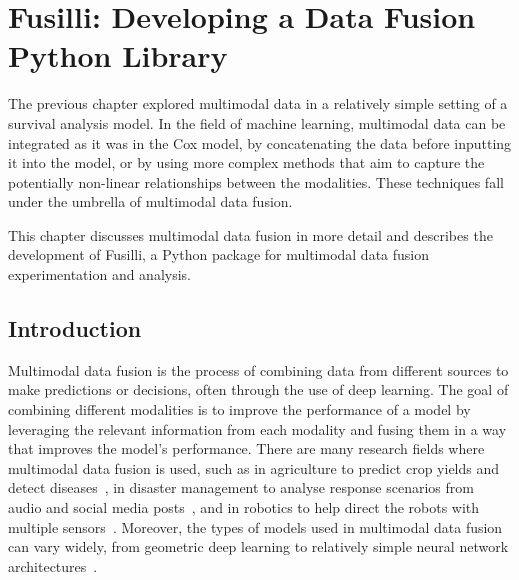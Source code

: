 \chapter{Fusilli: Developing a Data Fusion Python Library}
\label{fusilli_development}

The previous chapter explored multimodal data in a relatively simple setting of a survival analysis model.
In the field of machine learning, multimodal data can be integrated as it was in the Cox model, by concatenating the data before inputting it into the model, or by using more complex methods that aim to capture the potentially non-linear relationships between the modalities.
These techniques fall under the umbrella of multimodal data fusion.

This chapter discusses multimodal data fusion in more detail and describes the development of Fusilli, a Python package for multimodal data fusion experimentation and analysis.

\section{Introduction}

Multimodal data fusion is the process of combining data from different sources to make predictions or decisions, often through the use of deep learning.
The goal of combining different modalities is to improve the performance of a model by leveraging the relevant information from each modality and fusing them in a way that improves the model's performance.
There are many research fields where multimodal data fusion is used, such as in agriculture to predict crop yields and detect diseases~\cite{s.s.gopiMultimodalMachineLearning2023, patilRiceFusionMultimodalityData2022}, in disaster management to analyse response scenarios from audio and social media posts~\cite{algiriyageMultisourceMultimodalData2021}, and in robotics to help direct the robots with multiple sensors~\cite{duanMultimodalSensorsMLBased2022}.
Moreover, the types of models used in multimodal data fusion can vary widely, from geometric deep learning to relatively simple neural network architectures~\cite{cuiDeepMultimodalFusion2022}.


